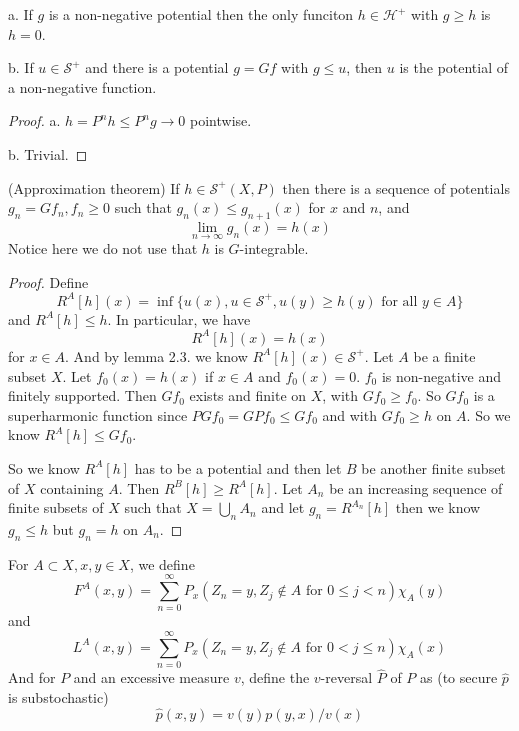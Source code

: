 \documentclass[lang=en, color=blue, ]{elegantbook}
\newcommand{\Har}{\mathcal{H}}
\newcommand{\Sar}{\mathcal{S}}
\begin{document}
\begin{corollary}
    a. If $g$ is a non-negative potential then the only funciton $h\in \Har^+$ with $g\geq h$ is $h = 0$.\par
    b. If $u \in \Sar^+$ and there is a potential $g = Gf$ with $g\leq u$, then $u$ is the potential of a non-negative function.
\end{corollary}
\begin{proof}
    a. $h = P^n h \leq P^ng \to 0$ pointwise.\par
    b. Trivial. 
\end{proof}

\begin{theorem}
    (Approximation theorem) If $h \in \Sar^+(X,P)$ then there is a sequence of potentials $g_n = Gf_n, f_n \geq 0$ such that $g_n(x) \leq g_{n+1}(x)$ for $x$ and $n$, and
    \[
    \lim_{n\to\infty} g_n(x) = h(x)
    \]
    Notice here we do not use that $h$ is $G$-integrable.
\end{theorem}
\begin{proof}
    Define
    \[
    R^A[h](x) = \inf\{u(x), u\in\Sar^+, u(y) \geq h(y)\text{ for all }y\in A\}
    \]
    and $R^A[h] \leq h$. In particular, we have
    \[
    R^A[h](x) = h(x) 
    \]
    for $x\in A$. And by lemma 2.3. we know $R^A[h](x) \in \Sar^+$. Let $A$ be a finite subset $X$. Let $f_0 (x) = h(x)$ if $x\in A$ and $f_0(x) = 0$. $f_0$ is non-negative and finitely supported. Then $Gf_0$ exists and finite on $X$, with $Gf_0 \geq f_0$. So $Gf_0$ is a superharmonic function since $P Gf_0 = GPf_0 \leq Gf_0$ and with $Gf_0 \geq h$ on  $A$. So we know $R^A[h]\leq Gf_0$.\par
    So we know $R^A[h]$ has to be a potential and then let $B$ be another finite subset of $X$ containing $A$. Then $R^{B}[h]\geq R^{A}[h]$. Let $A_n$ be an increasing sequence of finite subsets of $X$ such that $X = \bigcup_{n}A_n$ and let $g_n = R^{A_n}[h]$ then we know $g_n \leq h$ but $g_n = h$ on $A_n$. 
\end{proof}

\begin{definition}
    For $A\subset X, x,y \in X$, we define
    \[
    F^A(x,y) = \sum\limits_{n=0}^{\infty}P_x(Z_n = y, Z_j \notin A\text{ for }0\leq j < n)\chi_A(y)
    \]
    and
    \[
    L^A(x,y) = \sum\limits_{n=0}^{\infty}P_x(Z_n = y, Z_j \notin A\text{ for }0<j\leq n)\chi_A(x)
   \]
   And for $P$ and an excessive measure $v$, define the $v$-reversal $\hat{P}$ of $P$ as (to secure $\hat{p}$ is substochastic)
   \[
   \hat{p}(x,y) = v(y)p(y,x)/v(x)
   \]
\end{definition}
\end{document}
